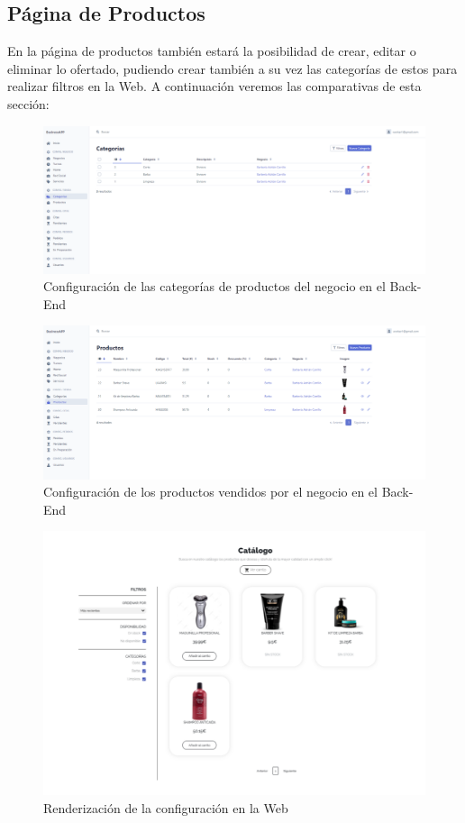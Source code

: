 \subsection{Página de Productos}

En la página de productos también estará la posibilidad de crear, editar o eliminar lo ofertado, pudiendo crear también a su vez las categorías de estos para realizar filtros en la Web. A continuación veremos las comparativas de esta sección:

\begin{figure}[H]
  \centering
  \includegraphics[scale=0.2]{images/back-end-categories.png}
  \caption{Configuración de las categorías de productos del negocio en el Back-End}
  \label{}
\end{figure}

\begin{figure}[H]
  \includegraphics[scale=0.2]{images/back-end-products.png}
  \caption{Configuración de los productos vendidos por el negocio en el Back-End}
  \label{}
\end{figure}

\begin{figure}[H]
  \centering
  \includegraphics[scale=0.3]{images/front-end-products.png}
  \caption{Renderización de la configuración en la Web}
  \label{}
\end{figure}

